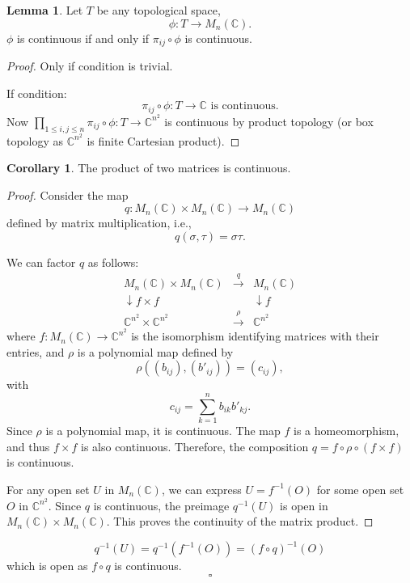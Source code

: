 \documentclass[11pt]{article}
\theoremstyle{definition}
\newtheorem{lemma}{Lemma}[section]
\newtheorem{corollary}{Corollary}[section]
\theoremstyle{remark}
\begin{document}
\begin{lemma}
Let $T$ be any topological space,
\[
\phi \colon T \to M_n(\mathbb{C}).
\]
$\phi$ is continuous if and only if $\pi_{ij} \circ \phi$ is continuous.
\end{lemma}

\begin{proof}
Only if condition is trivial.

If condition:
\[
\pi_{ij} \circ \phi \colon T \to \mathbb{C} \text{ is continuous.}
\]
Now $\prod_{1 \leq i,j \leq n} \pi_{ij} \circ \phi \colon T \to \mathbb{C}^{n^2}$ is continuous by product topology (or box topology as $\mathbb{C}^{n^2}$ is finite Cartesian product).
\end{proof}

\begin{corollary}
The product of two matrices is continuous.
\end{corollary}

\begin{proof}
Consider the map
\[ q: M_n(\mathbb{C}) \times M_n(\mathbb{C}) \to M_n(\mathbb{C}) \]
defined by matrix multiplication, i.e.,
\[ q(\sigma, \tau) = \sigma \tau. \]

We can factor $q$ as follows:
\[
\begin{array}{ccc}
M_n(\mathbb{C}) \times M_n(\mathbb{C}) & \xrightarrow{q} & M_n(\mathbb{C}) \\
\downarrow{f \times f} & & \downarrow{f} \\
\mathbb{C}^{n^2} \times \mathbb{C}^{n^2} & \xrightarrow{\rho} & \mathbb{C}^{n^2}
\end{array}
\]
where $f: M_n(\mathbb{C}) \to \mathbb{C}^{n^2}$ is the isomorphism identifying matrices with their entries, and $\rho$ is a polynomial map defined by
\[
\rho((b_{ij}), (b'_{ij})) = (c_{ij}),
\]
with
\[
c_{ij} = \sum_{k=1}^n b_{ik} b'_{kj}.
\]
Since $\rho$ is a polynomial map, it is continuous. The map $f$ is a homeomorphism, and thus $f \times f$ is also continuous. Therefore, the composition $q = f \circ \rho \circ (f \times f)$ is continuous.

For any open set $U$ in $M_n(\mathbb{C})$, we can express $U = f^{-1}(O)$ for some open set $O$ in $\mathbb{C}^{n^2}$. Since $q$ is continuous, the preimage $q^{-1}(U)$ is open in $M_n(\mathbb{C}) \times M_n(\mathbb{C})$. This proves the continuity of the matrix product.
\end{proof}

\[
q^{-1}(U) = q^{-1}(f^{-1}(O)) = (f \circ q)^{-1}(O)
\]
which is open as \( f \circ q \) is continuous.
\[
\square
\]
\end{document}
